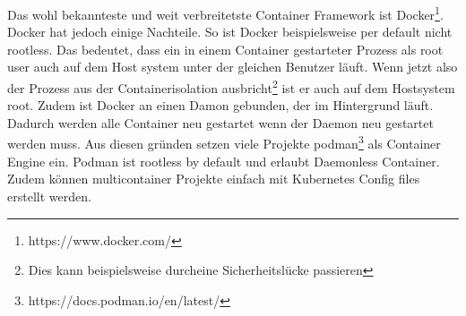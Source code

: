 Das wohl bekannteste und weit verbreitetste Container Framework
ist Docker\footnote{https://www.docker.com/}. Docker hat jedoch einige Nachteile.
So ist Docker beispielsweise per default nicht rootless.\cite{docker:rootless}
Das bedeutet, dass ein in einem Container gestarteter Prozess als root user
auch auf dem Host system unter der gleichen Benutzer läuft. Wenn jetzt also
der Prozess aus der Containerisolation ausbricht\footnote{Dies kann beispielsweise durcheine Sicherheitslücke passieren}
ist er auch auf dem Hostsystem root.\cite{so_2020}
Zudem ist Docker an einen Damon gebunden, der im Hintergrund läuft.
Dadurch werden alle Container neu gestartet wenn der Daemon neu gestartet werden muss.\cite{docker:daemon}
Aus diesen gründen setzen viele Projekte podman\footnote{https://docs.podman.io/en/latest/}
als Container Engine ein. Podman ist rootless by default und erlaubt Daemonless Container.
Zudem können multicontainer Projekte einfach mit Kubernetes Config files
erstellt werden.\cite{redhat:podman-pods}


